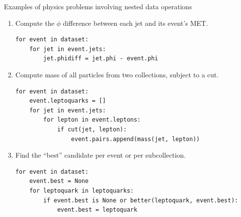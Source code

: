 \documentclass[aspectratio=169]{beamer}
\begin{document}
\begin{frame}[fragile]{Examples of physics problems involving nested data operations}
\vspace{0.2 cm}
\begin{enumerate}
\item Compute the $\phi$ difference between each jet and its event's MET.
\small
\begin{verbatim}
for event in dataset:
    for jet in event.jets:
        jet.phidiff = jet.phi - event.phi
\end{verbatim}
\normalsize

\vspace{0.3 cm}
\item<2-> Compute mass of all particles from two collections, subject to a cut.
\small
\begin{verbatim}
for event in dataset:
    event.leptoquarks = []
    for jet in event.jets:
        for lepton in event.leptons:
            if cut(jet, lepton):
                event.pairs.append(mass(jet, lepton))
\end{verbatim}
\normalsize

\vspace{0.3 cm}
\item<3-> Find the ``best'' candidate per event or per subcollection.
\small
\begin{verbatim}
for event in dataset:
    event.best = None
    for leptoquark in leptoquarks:
        if event.best is None or better(leptoquark, event.best):
            event.best = leptoquark
\end{verbatim}
\normalsize
\end{enumerate}
\end{frame}
\end{document}
